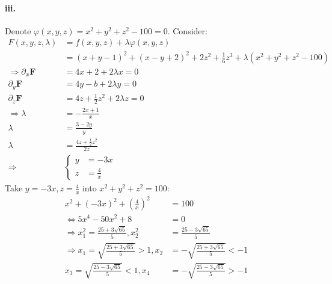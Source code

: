 \documentclass[11pt, a4paper]{article}
\begin{document}
\paragraph{iii.}
Denote $\varphi(x, y, z) = x^2 + y^2 + z^2 - 100 = 0$. Consider:
$$\begin{aligned}
    F(x, y, z, \lambda) &= f(x, y, z) + \lambda\varphi(x, y, z) \\
    &= (x + y - 1)^2 + (x - y + 2)^2 + 2z^2 + \frac{1}{6}z^3 + \lambda(x^2 + y^2 + z^2 - 100) \\
    \Rightarrow \partial_x\bm{F} &= 4x + 2 + 2\lambda x = 0 \\
    \partial_y\bm{F} &= 4y - b + 2\lambda y = 0 \\
    \partial_z\bm{F} &= 4z + \frac{1}{2}z^2 + 2\lambda z = 0 \\
    \Rightarrow \lambda &= -\frac{2x + 1}{x} \\
    \lambda &= \frac{3 - 2y}{y} \\
    \lambda &= \frac{4z + \frac{1}{2}z^2}{2z} \\
    \Rightarrow
    &\left\{
        \begin{aligned}
            y &= -3x \\
            z &= \frac{4}{x}
        \end{aligned} 
    \right.
\end{aligned}$$
Take $y = -3x, z = \frac{4}{x}$ into $x^2 + y^2 + z^2 = 100$:
$$\begin{aligned}
    x^2 + (-3x)^2 + (\frac{4}{x})^2 &= 100 \\
    \Leftrightarrow 5x^4 -50x^2 + 8 &= 0 \\
    \Rightarrow x^2_1 = \frac{25 + 3\sqrt{65}}{5}, x^2_2 &= \frac{25 - 3\sqrt{65}}{5} \\
    \Rightarrow x_1 = \sqrt{\frac{25 + 3\sqrt{65}}{5}} > 1, x_2 &= -\sqrt{\frac{25 + 3\sqrt{65}}{5}} < -1 \\
    x_3 = \sqrt{\frac{25 - 3\sqrt{65}}{5}} < 1, x_4 &= -\sqrt{\frac{25 - 3\sqrt{65}}{5}} > -1
\end{aligned}$$
\end{document}
